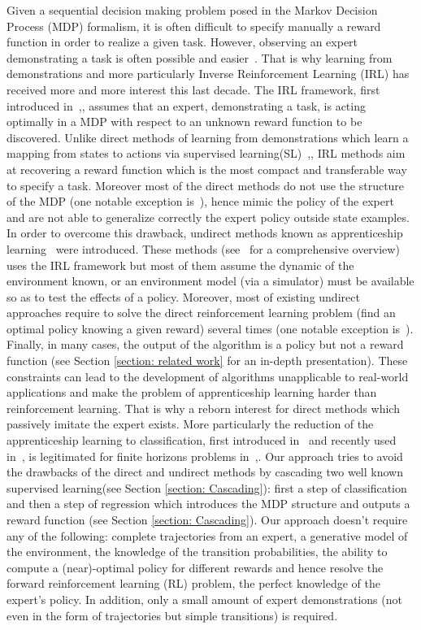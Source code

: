 \documentclass{article} %
\newcommand{\0}{\mathbf{0}}
\newcommand{\1}{\mathbf{1}}
\begin{document}
Given a sequential decision making problem posed in the Markov Decision Process (MDP) formalism, it is often difficult to specify manually a reward function in order to realize a given task. However, observing an expert demonstrating a task is often possible and easier~\cite{ng2000algorithms}. That is why learning from demonstrations and more particularly Inverse Reinforcement Learning (IRL) has received more and more interest this last decade. The IRL framework, first introduced in~\cite{russell1998learning},\cite{ng2000algorithms}, assumes that an expert, demonstrating a task, is acting optimally in a MDP with respect to an unknown reward function to be discovered. Unlike direct methods of learning from demonstrations which learn a mapping from states to actions via supervised learning(SL)~\cite{atkeson1997robot},\cite{pomerleau1989alvinn}, IRL methods aim at recovering a reward function which is the most compact and transferable way to specify a task. Moreover most of the direct methods do not use the structure of the MDP (one notable exception is~\cite{melo2010learning}), hence mimic the policy of the expert and are not able to generalize correctly the expert policy outside state examples. In order to overcome this drawback, undirect methods known as apprenticeship learning~\cite{abbeel2004apprenticeship} were introduced. These methods (see~\cite{neu2009training} for a comprehensive overview) uses the IRL framework but most of them assume the dynamic of the environment known, or an environment model (via a simulator) must be available so as to test the effects of a policy. Moreover, most of existing undirect approaches require to solve the direct reinforcement learning problem (find an optimal policy knowing a given reward) several times (one notable exception is~\cite{boularias2011relative}). Finally, in many cases, the output of the algorithm is a policy but not a reward function (see Section \ref{section: related work} for an in-depth presentation). These constraints can lead to the development of algorithms unapplicable to real-world applications and make the problem of apprenticeship learning harder than reinforcement learning. That is why a reborn interest for direct methods which passively imitate the expert exists. More particularly the reduction of the apprenticeship learning to classification, first introduced in~\cite{zadrozny2003cost} and recently used in~\cite{melo2010learning}, is legitimated for finite horizons problems in~\cite{syed2010reduction},\cite{ross2010efficient}. Our approach tries to avoid the drawbacks of the direct and undirect methods by cascading two well known supervised learning(see Section \ref{section: Cascading}): first a step of classification and then a step of regression which introduces the MDP structure and  outputs a reward function (see Section \ref{section: Cascading}). Our approach doesn't require any of the following: complete trajectories from an expert, a generative model of the environment, the knowledge of the transition probabilities, the ability to compute a (near)-optimal policy for different rewards and hence resolve the forward reinforcement learning (RL) problem, the perfect knowledge of the expert's policy. In addition, only a small amount of expert demonstrations (not even in the form of trajectories but simple transitions) is required.\\
\end{document}
